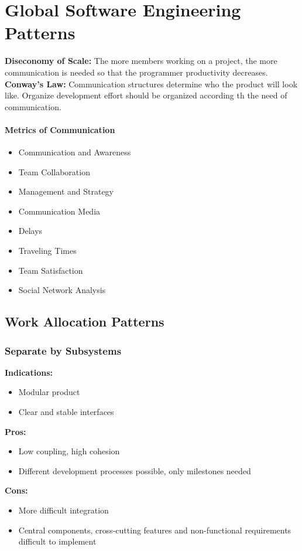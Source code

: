 
\section{Global Software Engineering Patterns}
\textbf{Diseconomy of Scale:}
The more members working on a project, the more communication is needed so that the programmer productivity decreases.\\
\textbf{Conway's Law:}
Communication structures determine who the product will look like.
Organize development effort should be organized according th the need of communication.


\paragraph{Metrics of Communication}
\begin{itemize}[topsep=5pt, itemsep=0pt]
  \item Communication and Awareness
  \item Team Collaboration
  \item Management and Strategy
  \item Communication Media
  \item Delays
  \item Traveling Times
  \item Team Satisfaction
  \item Social Network Analysis
\end{itemize}

\subsection{Work Allocation Patterns}
\subsubsection{Separate by Subsystems}
\textbf{Indications:}
\begin{itemize}[itemsep=0pt]
  \item Modular product
  \item Clear and stable interfaces
\end{itemize}
\textbf{Pros:}
\begin{itemize}[itemsep=0pt]
  \item Low coupling, high cohesion
  \item Different development processes possible, only milestones needed
\end{itemize}
\textbf{Cons:}
\begin{itemize}[itemsep=0pt]
  \item More difficult integration
  \item Central components, cross-cutting features and non-functional requirements difficult to implement
\end{itemize}

